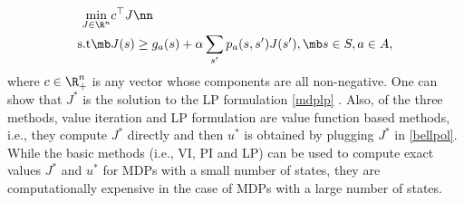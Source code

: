 \small
\begin{align}\label{mdplp}
\min_{J\in \R^n} &c^\top J\nn\\
\text{s.t}\mb &J(s)\geq g_a(s)+\alpha\sum_{s'}p_a(s,s')J(s'), \mb s\in S, a \in A,
\end{align}
\normalsize
where $c\in \R^n_+$ is any vector whose components are all non-negative. One can show that $J^*$ is the solution to the LP formulation \eqref{mdplp} \cite{BertB}. 
Also, of the three methods, value iteration and LP formulation are value function based methods, i.e., they compute $J^*$ directly and then $u^*$ is obtained by plugging $J^*$ in \eqref{bellpol}.\\
While the basic methods (i.e., VI, PI and LP) can be used to compute exact values $J^*$ and $u^*$ for MDPs with a small number of states, they are computationally expensive in the case of MDPs with a large number of states.\\

